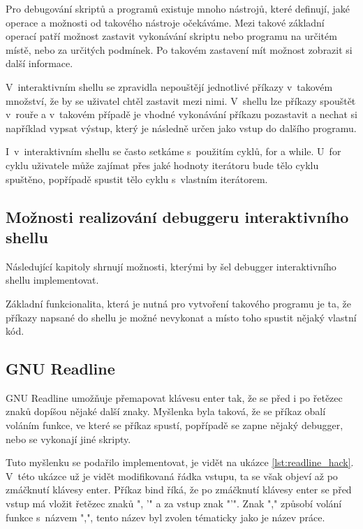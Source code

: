 \documentclass[thesis=M,czech]{FITthesis}[2012/06/26]
\begin{document}

Pro debugování skriptů a programů existuje mnoho nástrojů, které definují, jaké operace a možnosti od takového nástroje očekáváme. Mezi takové základní operací patří možnost zastavit vykonávání skriptu nebo programu na určitém místě, nebo za určitých podmínek. Po takovém zastavení mít možnost zobrazit si další informace.

V~interaktivním shellu se zpravidla nepouštějí jednotlivé příkazy v~takovém množství, že by se uživatel chtěl zastavit mezi nimi. V~shellu lze příkazy spouštět v~rouře a v~takovém případě je vhodné vykonávání příkazu pozastavit a nechat si například vypsat výstup, který je následně určen jako vstup do dalšího programu.

I~v~interaktivním shellu se často setkáme s~použitím cyklů, for a while. U~for cyklu uživatele může zajímat přes jaké hodnoty iterátoru bude tělo cyklu spuštěno, popřípadě spustit tělo cyklu s~vlastním iterátorem.




\subsection{Možnosti realizování debuggeru interaktivního shellu}

Následující kapitoly shrnují možnosti, kterými by šel debugger interaktivního shellu implementovat.

Základní funkcionalita, která je nutná pro vytvoření takového programu je ta, že příkazy napsané do shellu je možné nevykonat a místo toho spustit nějaký vlastní kód.

\subsection{GNU Readline}

GNU Readline umožňuje přemapovat klávesu enter tak, že se před i po řetězec znaků dopíšou nějaké další znaky. Myšlenka byla taková, že se příkaz obalí voláním funkce, ve které se příkaz spustí, popřípadě se zapne nějaký debugger, nebo se vykonají jiné skripty.

Tuto myšlenku se podařilo implementovat, je vidět na ukázce \ref{lst:readline_hack}. V~této ukázce už je vidět modifikovaná řádka vstupu, ta se však objeví až po zmáčknutí klávesy enter. Příkaz bind říká, že po zmáčknutí klávesy enter se před vstup má vložit řetězec znaků ", '" a za vstup znak "'". Znak "," způsobí volání funkce s~názvem ",", tento název byl zvolen tématicky jako je název práce.
\end{document}
